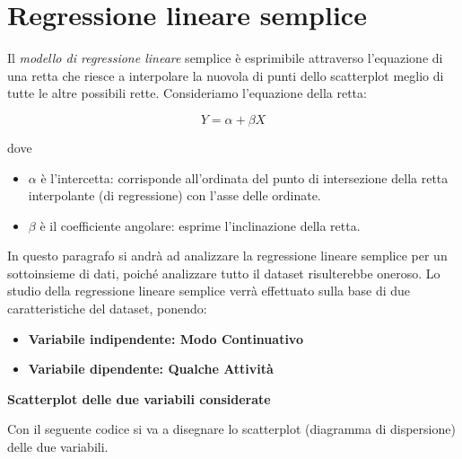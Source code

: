 \section{Regressione lineare semplice}\label{cap4.2}

Il \textit{modello di regressione lineare} semplice è esprimibile attraverso l'equazione di una retta che riesce a interpolare la nuovola di punti dello scatterplot meglio di tutte le altre possibili rette. Consideriamo l'equazione della retta: 

\[Y = \alpha + \beta X\]

\noindent dove

\begin{itemize}
    \item $\alpha$ è l'intercetta: corrisponde all'ordinata del punto di intersezione della retta interpolante (di regressione) con l'asse delle ordinate.
    \item $\beta$ è il coefficiente angolare: esprime l'inclinazione della retta.
\end{itemize}

In questo paragrafo si andrà ad analizzare la regressione lineare semplice per un sottoinsieme di dati, poiché analizzare tutto il dataset risulterebbe oneroso. Lo studio della regressione lineare semplice verrà effettuato sulla base di due caratteristiche del dataset, ponendo:

\begin{itemize}
    \item \textbf{Variabile indipendente: Modo Continuativo}
    \item \textbf{Variabile dipendente: Qualche Attività}
\end{itemize}

\noindent \textbf{Scatterplot delle due variabili considerate}

Con il seguente codice si va a disegnare lo scatterplot (diagramma di dispersione) delle due variabili.

